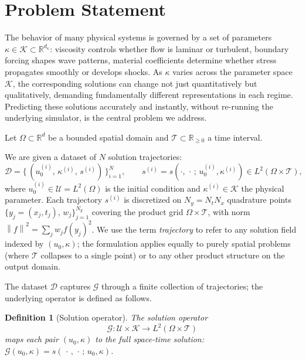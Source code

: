 \documentclass{article}
\newtheorem{definition}{Definition}
\newcommand{\R}{\mathbb{R}}
\newcommand{\cK}{\mathcal{K}}
\newcommand{\cD}{\mathcal{D}}
\newcommand{\normsq}[1]{\left\|#1\right\|^{2}}
\newcommand{\T}{\mathcal{T}}
\newcommand{\cG}{\mathcal{G}}
\begin{document}
\section{Problem Statement}

The behavior of many physical systems is governed by a set of parameters $\kappa \in \cK \subset \R^{d_\kappa}$: viscosity controls whether flow is laminar or turbulent, boundary forcing shapes wave patterns, material coefficients determine whether stress propagates smoothly or develops shocks. As $\kappa$ varies across the parameter space $\cK$, the corresponding solutions can change not just quantitatively but qualitatively, demanding fundamentally different representations in each regime. Predicting these solutions accurately and instantly, without re-running the underlying simulator, is the central problem we address.

Let $\Omega \subset \R^d$ be a bounded spatial domain and $\T \subset \R_{\geq 0}$ a time interval.

We are given a dataset of $N$ solution trajectories:
\begin{equation}
  \cD = \bigl\{\,(u^{(i)}_0,\,\kappa^{(i)},\,s^{(i)})\,\bigr\}_{i=1}^{N},
  \qquad
  s^{(i)} = s\!\left(\cdot,\,\cdot\,;\,u^{(i)}_0,\kappa^{(i)}\right)
  \in L^2(\Omega\times\mathcal{T}),
  \label{eq:dataset}
\end{equation}
where $u_0^{(i)} \in \mathcal{U} = L^2(\Omega)$ is the initial condition and $\kappa^{(i)} \in \cK$ the physical parameter.
Each trajectory $s^{(i)}$ is discretized on $N_y = N_t N_x$ quadrature points
$\{y_j = (x_j, t_j),\, w_j\}_{j=1}^{N_y}$ covering the product grid
$\Omega \times \mathcal{T}$, with norm $\normsq{f} = \sum_j w_j f(y_j)^2$.
We use the term \emph{trajectory} to refer to any solution field indexed by $(u_0,\kappa)$;
the formulation applies equally to purely spatial problems (where $\mathcal{T}$ collapses to a single point)
or to any other product structure on the output domain.


The dataset $\cD$ captures $\cG$ through a finite collection of trajectories; the underlying operator is defined as follows.

\begin{definition}[Solution operator]
\label{def:operator}
The \emph{solution operator}
 \[ \cG: \mathcal{U} \times \cK \to L^2(\Omega \times \T) \]
maps each pair $(u_0,\kappa)$ to the full space-time solution:
$\cG(u_0,\kappa) = s(\,\cdot\,,\,\cdot\,;\,u_0,\kappa)$.
\end{definition}
\end{document}
